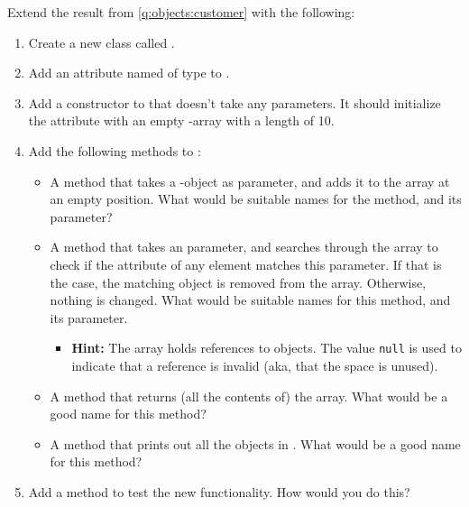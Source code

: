 Extend the result from \ref{q:objects:customer} with the following:
\begin{enumerate}
  \item Create a new class called .
  \item Add an attribute named  of type  to .
  \item Add a constructor to  that doesn't take any parameters. It should initialize the  attribute with an empty -array with a length of 10.
  \item Add the following methods to :
    \begin{itemize}
      \item A method that takes a  -object as parameter, and adds it to the  array at an empty position. What would be suitable names for the method, and its parameter?
      \item A method that takes an  parameter, and searches through the  array to check if the  attribute of any element matches this parameter. If that is the case, the matching object is removed from the array. Otherwise, nothing is changed. What would be suitable names for this method, and its parameter.
        \begin{itemize}
          \item \textbf{Hint:} The  array holds references to  objects. The value \texttt{null} is used to indicate that a reference is invalid (aka, that the space is unused).
        \end{itemize}
      \item A method that returns (all the contents of) the  array. What would be a good name for this method?
      \item A method that prints out all the  objects in . What would be a good name for this method?
    \end{itemize}
  \item Add a  method to test the new functionality. How would you do this?
\end{enumerate}

